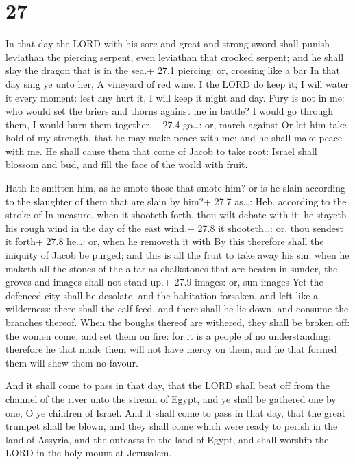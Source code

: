\hypertarget{section-26}{%
\section{27}\label{section-26}}

 In that day the LORD with his sore and great and strong
sword shall punish leviathan the piercing serpent, even leviathan that
crooked serpent; and he shall slay the dragon that is in the sea.+ 27.1
piercing: or, crossing like a bar  In that day sing ye unto
her, A vineyard of red wine.  I the LORD do keep it; I will
water it every moment: lest any hurt it, I will keep it night and day.
 Fury is not in me: who would set the briers and thorns
against me in battle? I would go through them, I would burn them
together.+ 27.4 go\ldots: or, march against  Or let him take
hold of my strength, that he may make peace with me; and he shall make
peace with me.  He shall cause them that come of Jacob to
take root: Israel shall blossom and bud, and fill the face of the world
with fruit.

 Hath he smitten him, as he smote those that smote him? or
is he slain according to the slaughter of them that are slain by him?+
27.7 as\ldots: Heb. according to the stroke of  In measure,
when it shooteth forth, thou wilt debate with it: he stayeth his rough
wind in the day of the east wind.+ 27.8 it shooteth\ldots: or, thou
sendest it forth+ 27.8 he\ldots: or, when he removeth it with
 By this therefore shall the iniquity of Jacob be purged;
and this is all the fruit to take away his sin; when he maketh all the
stones of the altar as chalkstones that are beaten in sunder, the groves
and images shall not stand up.+ 27.9 images: or, sun images
 Yet the defenced city shall be desolate, and the
habitation forsaken, and left like a wilderness: there shall the calf
feed, and there shall he lie down, and consume the branches thereof.
 When the boughs thereof are withered, they shall be broken
off: the women come, and set them on fire: for it is a people of no
understanding: therefore he that made them will not have mercy on them,
and he that formed them will shew them no favour.

 And it shall come to pass in that day, that the LORD
shall beat off from the channel of the river unto the stream of Egypt,
and ye shall be gathered one by one, O ye children of Israel.
 And it shall come to pass in that day, that the great
trumpet shall be blown, and they shall come which were ready to perish
in the land of Assyria, and the outcasts in the land of Egypt, and shall
worship the LORD in the holy mount at Jerusalem.

